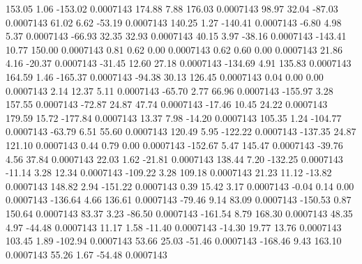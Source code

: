       153.05        1.06     -153.02     0.0007143
      174.88        7.88      176.03     0.0007143
       98.97       32.04      -87.03     0.0007143
       61.02        6.62      -53.19     0.0007143
      140.25        1.27     -140.41     0.0007143
       -6.80        4.98        5.37     0.0007143
      -66.93       32.35       32.93     0.0007143
       40.15        3.97      -38.16     0.0007143
     -143.41       10.77      150.00     0.0007143
        0.81        0.62        0.00     0.0007143
        0.62        0.60        0.00     0.0007143
       21.86        4.16      -20.37     0.0007143
      -31.45       12.60       27.18     0.0007143
     -134.69        4.91      135.83     0.0007143
      164.59        1.46     -165.37     0.0007143
      -94.38       30.13      126.45     0.0007143
        0.04        0.00        0.00     0.0007143
        2.14       12.37        5.11     0.0007143
      -65.70        2.77       66.96     0.0007143
     -155.97        3.28      157.55     0.0007143
      -72.87       24.87       47.74     0.0007143
      -17.46       10.45       24.22     0.0007143
      179.59       15.72     -177.84     0.0007143
       13.37        7.98      -14.20     0.0007143
      105.35        1.24     -104.77     0.0007143
      -63.79        6.51       55.60     0.0007143
      120.49        5.95     -122.22     0.0007143
     -137.35       24.87      121.10     0.0007143
        0.44        0.79        0.00     0.0007143
     -152.67        5.47      145.47     0.0007143
      -39.76        4.56       37.84     0.0007143
       22.03        1.62      -21.81     0.0007143
      138.44        7.20     -132.25     0.0007143
      -11.14        3.28       12.34     0.0007143
     -109.22        3.28      109.18     0.0007143
       21.23       11.12      -13.82     0.0007143
      148.82        2.94     -151.22     0.0007143
        0.39       15.42        3.17     0.0007143
       -0.04        0.14        0.00     0.0007143
     -136.64        4.66      136.61     0.0007143
      -79.46        9.14       83.09     0.0007143
     -150.53        0.87      150.64     0.0007143
       83.37        3.23      -86.50     0.0007143
     -161.54        8.79      168.30     0.0007143
       48.35        4.97      -44.48     0.0007143
       11.17        1.58      -11.40     0.0007143
      -14.30       19.77       13.76     0.0007143
      103.45        1.89     -102.94     0.0007143
       53.66       25.03      -51.46     0.0007143
     -168.46        9.43      163.10     0.0007143
       55.26        1.67      -54.48     0.0007143
